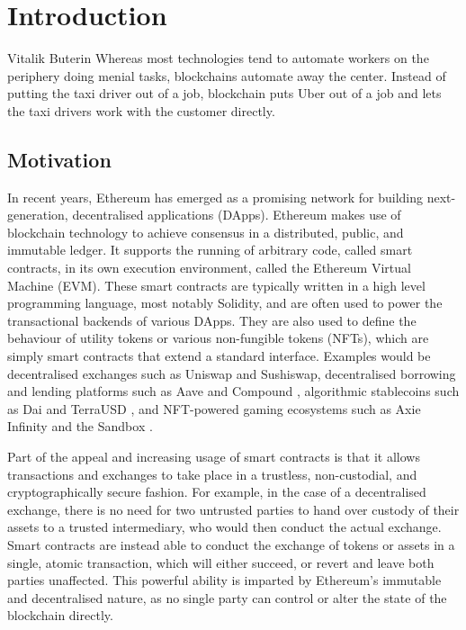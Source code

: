 \chapter{Introduction}

\begin{chapquote}{Vitalik Buterin \cite{vitalikquote}}
    Whereas most technologies tend to automate workers on the 
    periphery doing menial tasks, blockchains automate away the center.
    Instead of putting the taxi driver out of a job, blockchain puts 
    Uber out of a job and lets the taxi drivers work with the customer 
    directly.
\end{chapquote}

\section{Motivation}
In recent years, Ethereum has emerged as a promising network
for building next-generation, decentralised applications (DApps). Ethereum makes use of
blockchain technology to achieve consensus in a distributed, public,
and immutable ledger. It supports the running of arbitrary code, called smart contracts,
in its own execution environment, called the Ethereum Virtual Machine (EVM).
These smart contracts are typically written in a high level programming
language, most notably Solidity, and are often used to power the transactional
backends of various DApps. They are also used to define the behaviour of utility tokens 
or various non-fungible tokens (NFTs), which are simply smart contracts that extend a standard
interface. Examples would be decentralised exchanges such 
as Uniswap \cite{uniswap} and Sushiswap, decentralised borrowing and lending platforms such as
Aave \cite{aave} and Compound \cite{compound}, algorithmic stablecoins such as Dai \cite{makerdao} and TerraUSD \cite{terra}, and NFT-powered gaming 
ecosystems such as Axie Infinity \cite{axieinfinity} and the Sandbox \cite{sandbox}.

Part of the appeal and increasing usage of smart contracts is that it allows transactions and exchanges
to take place in a trustless, non-custodial, and cryptographically secure fashion.
For example, in the case of a decentralised exchange, there is no need for two
untrusted parties to hand over custody of their assets to a trusted intermediary,
who would then conduct the actual exchange. Smart contracts are instead able to conduct
the exchange of tokens or assets in a single, atomic transaction,
which will either succeed, or revert and leave both parties unaffected.
This powerful ability is imparted by Ethereum's immutable and decentralised nature, 
as no single party can control or alter the state of the blockchain directly.

